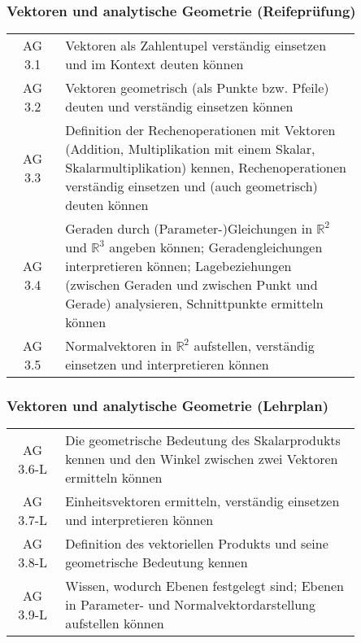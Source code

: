 \documentclass[a4paper,12pt]{article}
\begin{document}
\subsubsection{Vektoren und analytische Geometrie (Reifeprüfung)}
\begin{tabular}{cp{0.85\linewidth}}
AG 3.1 & Vektoren als Zahlentupel verständig einsetzen und im Kontext deuten können\\

AG 3.2 & Vektoren geometrisch (als Punkte bzw. Pfeile) deuten und verständig einsetzen können\\

AG 3.3 & Definition der Rechenoperationen mit Vektoren (Addition, Multiplikation mit einem Skalar, Skalarmultiplikation) kennen, Rechenoperationen verständig einsetzen und (auch geometrisch) deuten können\\

AG 3.4 & Geraden durch (Parameter-)Gleichungen in $\mathbb{R}^2$ und $\mathbb{R}^3$ angeben können; Geradengleichungen interpretieren können; Lagebeziehungen (zwischen Geraden und zwischen Punkt und Gerade) analysieren, Schnittpunkte ermitteln können\\

AG 3.5 & Normalvektoren in $\mathbb{R}^2$ aufstellen, verständig einsetzen und interpretieren können\\
\end{tabular}

\subsubsection{Vektoren und analytische Geometrie (Lehrplan)}
\begin{em}
\begin{tabular}{cp{0.85\linewidth}}
AG 3.6-L & Die geometrische Bedeutung des Skalarprodukts kennen und den Winkel zwischen zwei Vektoren ermitteln können\\

AG 3.7-L & Einheitsvektoren ermitteln, verständig einsetzen und interpretieren können\\

AG 3.8-L & Definition des vektoriellen Produkts und seine geometrische Bedeutung kennen\\

AG 3.9-L & Wissen, wodurch Ebenen festgelegt sind; Ebenen in Parameter- und Normalvektordarstellung aufstellen können\\
\end{tabular}
\end{em}
\end{document}
